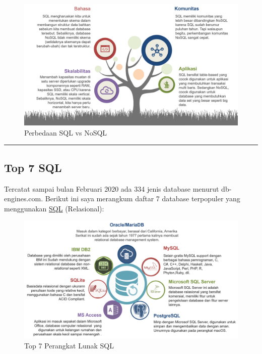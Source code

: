 \documentclass[
]{book}
\begin{document}
\begin{figure}

{\centering \includegraphics[width=1\linewidth]{./images/Bab1/Perbedaan_DB} 

}

\caption{Perbedaan SQL vs NoSQL}\label{fig:Perbedaan}
\end{figure}

\begin{center}\rule{0.5\linewidth}{0.5pt}\end{center}

\hypertarget{top-7-sql}{%
\subsection{Top 7 SQL}\label{top-7-sql}}

Tercatat sampai bulan Februari 2020 ada 334 jenis database menurut db-engines.com. Berikut ini saya merangkum daftar 7 database terpopuler yang menggunakan \href{https://qwords.com/blog/database-terpopuler/}{SQL} (Relasional):

\begin{figure}

{\centering \includegraphics[width=1\linewidth]{./images/Bab1/7SQL_DB} 

}

\caption{Top 7 Perangkat Lunak SQL}\label{fig:top7SQL}
\end{figure}
\end{document}
